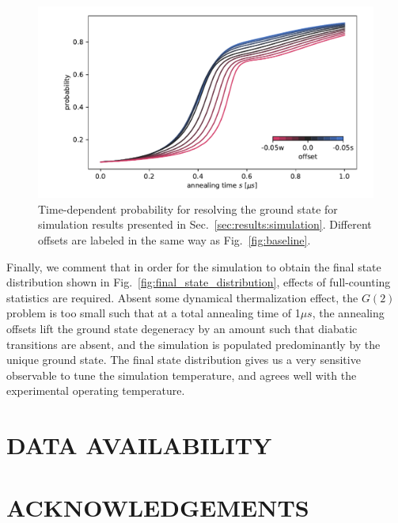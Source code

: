\documentclass[prd,twocolumn,tightenlines,preprintnumbers,showpacs,superscriptaddress,notitlepage,nofootinbib,eqsecnum,floatfix,longbibliography,aps,10pt]{revtex4-2}
\begin{document}
\begin{figure}
	\centering
	\includegraphics[width=\columnwidth]{./new_figures/time_dependent_probability.pdf}
	\caption{Time-dependent probability for resolving the ground state for simulation results presented in Sec.~\ref{sec:results:simulation}. Different offsets are labeled in the same way as Fig.~\ref{fig:baseline}.}
	\label{fig:td_prob}
\end{figure}

Finally, we comment that in order for the simulation to obtain the final state distribution shown in Fig.~\ref{fig:final_state_distribution}, effects of full-counting statistics are required.
Absent some dynamical thermalization effect, the $G(2)$ problem is too small such that at a total annealing time of 1$\mu s$, the annealing offsets lift the ground state degeneracy by an amount such that diabatic transitions are absent, and the simulation is populated predominantly by the unique ground state.
The final state distribution gives us a very sensitive observable to tune the simulation temperature, and agrees well with the experimental operating temperature.



\section{DATA AVAILABILITY}
\label{sec:open-source}


\section{ACKNOWLEDGEMENTS}
\end{document}
